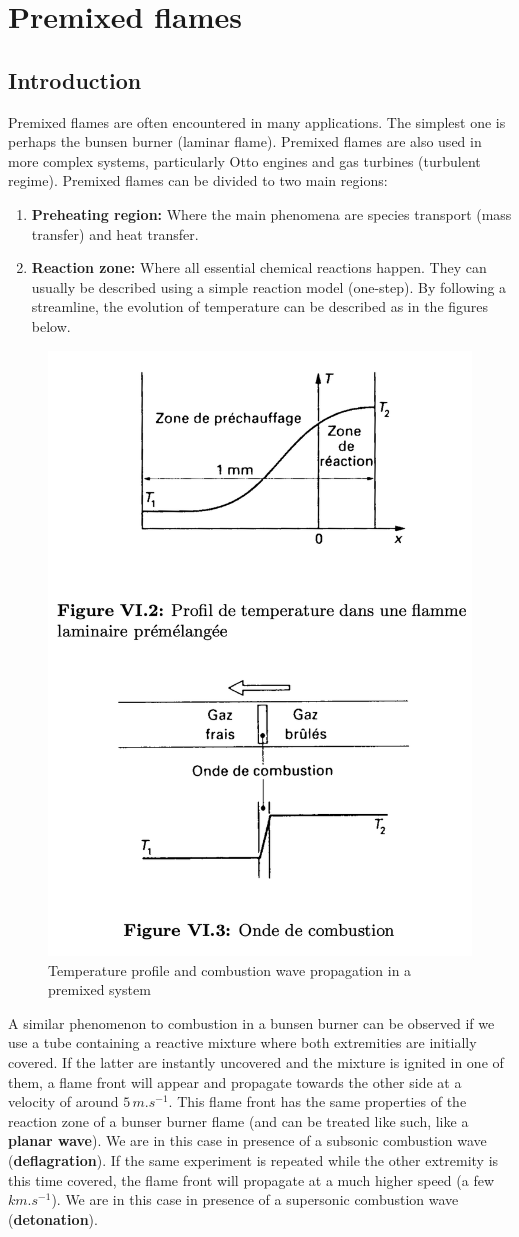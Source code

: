 \documentclass[a4paper,11pt]{article}
\begin{document}
\section{Premixed flames}
\subsection{Introduction}
Premixed flames are often encountered in many applications. The simplest one is perhaps the bunsen burner (laminar flame). Premixed flames are also used in more complex systems, particularly Otto engines and gas turbines (turbulent regime). Premixed flames can be divided to two main regions:
\begin{enumerate}
	\item \textbf{Preheating region:} Where the main phenomena are species transport (mass transfer) and heat transfer.
	\item \textbf{Reaction zone:} Where all essential chemical reactions happen. They can usually be described using a simple reaction model (one-step). By following a streamline, the evolution of temperature can be described as in the figures below.
\end{enumerate}
\begin{figure}[h]
	\centering
	\includegraphics[width=.49\linewidth]{figures/prmx.png}
	\caption{Temperature profile and combustion wave propagation in a premixed system}
\end{figure}
A similar phenomenon to combustion in a bunsen burner can be observed if we use a tube containing a reactive mixture where both extremities are initially covered. If the latter are instantly uncovered and the mixture is ignited in one of them, a flame front will appear and propagate towards the other side at a velocity of around $5\,m.s^{-1}$. This flame front has the same properties of the reaction zone of a bunser burner flame (and can be treated like such, like a \textbf{planar wave}). We are in this case in presence of a subsonic combustion wave (\textbf{deflagration}). If the same experiment is repeated while the other extremity is this time covered, the flame front will propagate at a much higher speed (a few $km.s^{-1}$). We are in this case in presence of a supersonic combustion wave (\textbf{detonation}).
\end{document}
